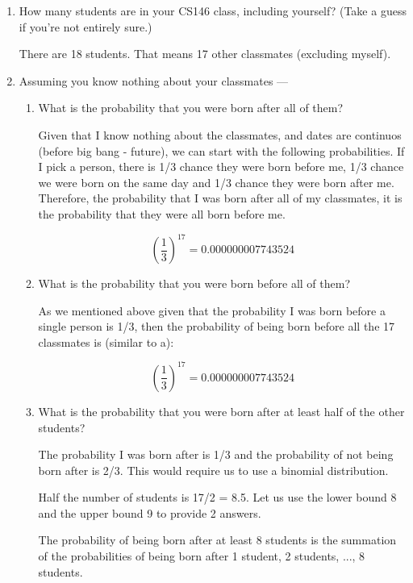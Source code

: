 \documentclass{article}
\begin{document}
\begin{enumerate}
    \item How many students are in your CS146 class, including yourself? (Take a guess if you’re not entirely sure.)
        
    There are 18 students. That means 17 other classmates (excluding myself).

    \item Assuming you know nothing about your classmates —
            \begin{enumerate}
                \item What is the probability that you were born after all of them?
                
                Given that I know nothing about the classmates, and dates are continuos (before big bang - future), we can 
                start with the following probabilities. If I pick a person, there is 1/3 chance they were born before me,
                1/3 chance we were born on the same day and 1/3 chance they were born after me. Therefore, the probability that
                I was born after all of my classmates, it is the probability that they were all born before me.

                $$\left(\frac{1}{3}\right)^{17} = 0.000000007743524$$

                \item What is the probability that you were born before all of them?
                
                As we mentioned above given that the probability I was born before a single person is 1/3, then
                the probability of being born before all the 17 classmates is (similar to a):

                $$\left(\frac{1}{3}\right)^{17} = 0.000000007743524$$

                \item What is the probability that you were born after at least half of the other students?
                
                The probability I was born after is 1/3 and the probability of not being born after is 2/3. This would
                require us to use a binomial distribution. 

                Half the number of students is 17/2 = 8.5. Let us use the lower bound 8 and the upper bound 9 to provide
                2 answers.

                The probability of being born after at least 8 students is the summation of the probabilities of being born
                after 1 student, 2 students, ..., 8 students.


\end{enumerate}
\end{enumerate}
\end{document}
